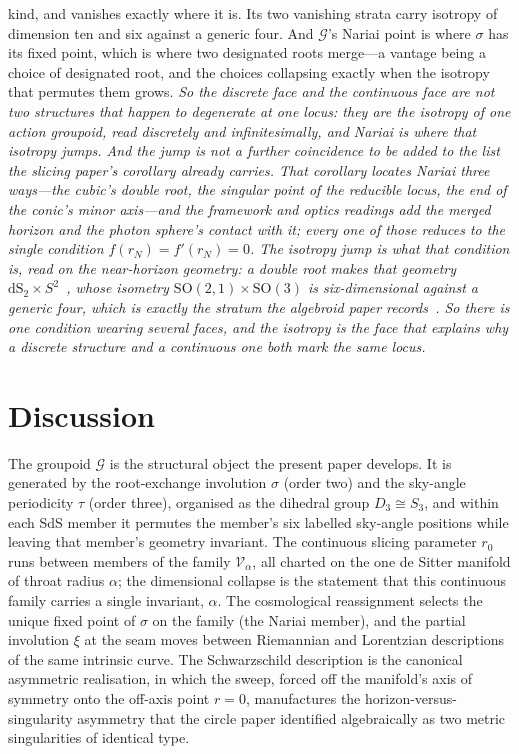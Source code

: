\documentclass[11pt,a4paper]{article}
\theoremstyle{definition}
\begin{document}
kind, and vanishes exactly where it is. Its two vanishing strata carry isotropy of dimension ten and six against
a generic four. And $\mathcal{G}$'s Nariai point is where $\sigma$ has its fixed
point, which is where two designated roots merge---a vantage being a choice of designated root, and the choices
collapsing exactly when the isotropy that permutes them grows. \emph{So the discrete face and the continuous
face are not two structures that happen to degenerate at one locus: they are the isotropy of one action groupoid,
read discretely and infinitesimally, and Nariai is where that isotropy jumps. And the jump is not a further coincidence to be added to the list the slicing paper's corollary already carries. That corollary locates Nariai three ways---the cubic's double root, the singular point of the reducible locus, the end of the conic's minor axis---and the framework and optics readings add the merged horizon and the photon sphere's contact with it; every one of those reduces to the single condition $f(r_{N})=f'(r_{N})=0$. The isotropy jump is what that condition \emph{is}, read on the near-horizon geometry: a double root makes that geometry $\mathrm{dS}_{2}\times S^{2}$~\cite{GinspargPerry1983}, whose isometry $\mathrm{SO}(2,1)\times\mathrm{SO}(3)$ is six-dimensional against a generic four, which is exactly the stratum the algebroid paper records~\cite{JanzenAlgebroid}. \emph{So there is one condition wearing several faces, and the isotropy is the face that explains why a discrete structure and a continuous one both mark the same locus.}}

\section{Discussion}\label{sec:discussion}

The groupoid $\mathcal{G}$ is the structural object the present paper develops. It is generated by the root-exchange involution $\sigma$ (order two) and the sky-angle periodicity $\tau$ (order three), organised as the dihedral group $D_{3}\cong S_{3}$, and within each SdS member it permutes the member's six labelled sky-angle positions while leaving that member's geometry invariant. The continuous slicing parameter $r_{0}$ runs between members of the family $\mathcal{V}_{\alpha}$, all charted on the one de Sitter manifold of throat radius $\alpha$; the dimensional collapse is the statement that this continuous family carries a single invariant, $\alpha$. The cosmological reassignment selects the unique fixed point of $\sigma$ on the family (the Nariai member), and the partial involution $\xi$ at the seam moves between Riemannian and Lorentzian descriptions of the same intrinsic curve. The Schwarzschild description is the canonical asymmetric realisation, in which the sweep, forced off the manifold's axis of symmetry onto the off-axis point $r=0$, manufactures the horizon-versus-singularity asymmetry that the circle paper identified algebraically as two metric singularities of identical type.
\end{document}
